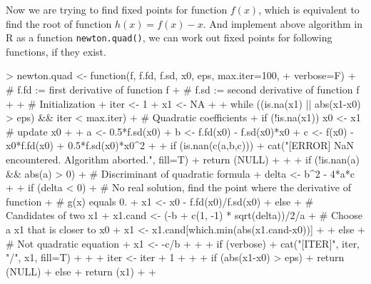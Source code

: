 \documentclass{article}
\begin{document}
Now we are trying to find fixed points for function $f(x)$, which is equivalent to find the root of function $h(x) = f(x) - x$. And implement above algorithm in R as a function \verb=newton.quad()=, we can work out fixed points for following functions, if they exist.
\begin{Schunk}
\begin{Sinput}
> newton.quad <- function(f, f.fd, f.sd, x0, eps, max.iter=100,
+                         verbose=F){
+     # f.fd := first derivative of function f
+     # f.sd := second derivative of function f
+ 
+     # Initialization
+     iter <- 1
+     x1 <- NA
+ 
+     while ((is.na(x1) || abs(x1-x0) > eps) && iter < max.iter){
+         # Quadratic coefficients
+         if (!is.na(x1)) x0 <- x1 # update x0
+ 
+         a <- 0.5*f.sd(x0)
+         b <- f.fd(x0) - f.sd(x0)*x0
+         c <- f(x0) - x0*f.fd(x0) + 0.5*f.sd(x0)*x0^2
+ 
+         if (is.nan(c(a,b,c))){
+             cat("[ERROR] NaN encountered. Algorithm aborted.", fill=T)
+             return (NULL)
+         }
+ 
+         if (!is.nan(a) && abs(a) > 0){
+             # Discriminant of quadratic formula
+             delta <- b^2 - 4*a*c
+ 
+             if (delta < 0){
+                 # No real solution, find the point where the derivative of function
+                 # g(x) equals 0.
+                 x1 <- x0 - f.fd(x0)/f.sd(x0) 
+             } else {
+                 # Candidates of two x1
+                 x1.cand <- (-b + c(1, -1) * sqrt(delta))/2/a
+                 # Choose a x1 that is closer to x0
+                 x1 <- x1.cand[which.min(abs(x1.cand-x0))]
+             }
+         } else {
+             # Not quadratic equation
+             x1 <- -c/b
+         }
+ 
+         if (verbose){
+             cat("[ITER]", iter, "/", x1, fill=T)
+         }
+ 
+         iter <- iter + 1
+     }
+ 
+     if (abs(x1-x0) > eps){
+         return (NULL)
+     } else {
+         return (x1)
+     }
+ }
\end{Sinput}
\end{Schunk}
\end{document}
